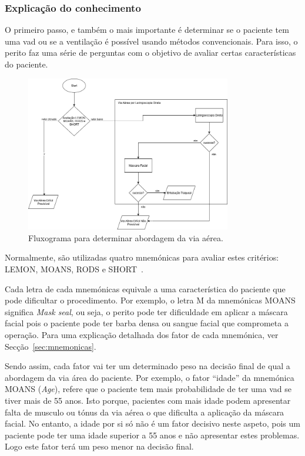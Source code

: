 \documentclass[a4paper,12pt,twoside]{article}
\begin{document}
    \subsubsection{Explicação do conhecimento}
    O primeiro passo, e também o mais importante é determinar se o paciente tem uma \gls{vad} ou se a ventilação é possível usando métodos convencionais. Para isso, o perito faz uma série de perguntas com o objetivo de avaliar certas características do paciente. 
    
    \begin{figure}[H]
        \centering
        \includegraphics[width=0.8\textwidth]{./resources/pdf/vapld.drawio.png}
        \caption{Fluxograma para determinar abordagem da via aérea.}
        \label{fig:detva}
    \end{figure}

    Normalmente, são utilizadas quatro mnemónicas para avaliar estes critérios: \gls{LEMON}, \gls{MOANS}, \gls{RODS} e \gls{SHORT}~\cite{consensosva}.

    Cada letra de cada mnemónicas equivale a uma característica do paciente que pode dificultar o procedimento. Por exemplo, o letra M da mnemónicas \gls{MOANS} significa \textit{Mask seal}, ou seja, o perito pode ter dificuldade em aplicar a máscara facial pois o paciente pode ter barba densa ou sangue facial que comprometa a operação. Para uma explicação detalhada dos fator de cada mnemónica, ver Secção~\ref{sec:mnemonicas}.

    Sendo assim, cada fator vai ter um determinado peso na decisão final de qual a abordagem da via área do paciente. Por exemplo, o fator ``idade'' da mnemónica \gls{MOANS} (\textit{Age}), refere que o paciente tem mais probabilidade de ter uma \gls{vad} se tiver mais de 55 anos. Isto porque, pacientes com mais idade podem apresentar falta de musculo ou tónus da via aérea o que dificulta a aplicação da máscara facial. No entanto, a idade por si só não é um fator decisivo neste aspeto, pois um paciente pode ter uma idade superior a 55 anos e não apresentar estes problemas. Logo este fator terá um peso menor na decisão final.
\end{document}
